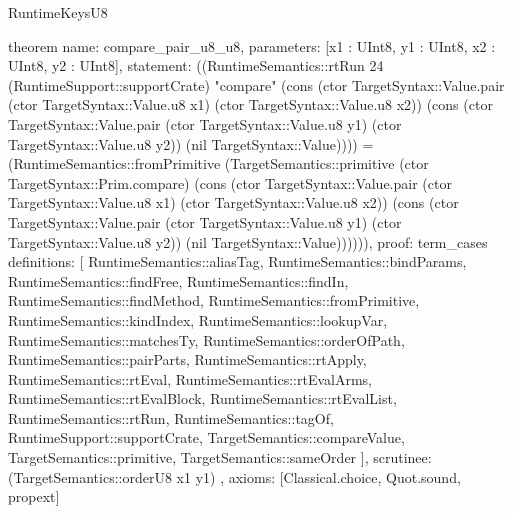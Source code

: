 \begin{lexlean}{RuntimeKeysU8}
\begin{semanticmodule}
theorem{
  name: compare_pair_u8_u8,
  parameters: [x1 : UInt8, y1 : UInt8, x2 : UInt8, y2 : UInt8],
  statement: ((RuntimeSemantics::rtRun 24 (RuntimeSupport::supportCrate) "compare" (cons (ctor TargetSyntax::Value.pair (ctor TargetSyntax::Value.u8 x1) (ctor TargetSyntax::Value.u8 x2)) (cons (ctor TargetSyntax::Value.pair (ctor TargetSyntax::Value.u8 y1) (ctor TargetSyntax::Value.u8 y2)) (nil TargetSyntax::Value)))) = (RuntimeSemantics::fromPrimitive (TargetSemantics::primitive (ctor TargetSyntax::Prim.compare) (cons (ctor TargetSyntax::Value.pair (ctor TargetSyntax::Value.u8 x1) (ctor TargetSyntax::Value.u8 x2)) (cons (ctor TargetSyntax::Value.pair (ctor TargetSyntax::Value.u8 y1) (ctor TargetSyntax::Value.u8 y2)) (nil TargetSyntax::Value)))))),
  proof: term_cases{
    definitions: [
      RuntimeSemantics::aliasTag,
      RuntimeSemantics::bindParams,
      RuntimeSemantics::findFree,
      RuntimeSemantics::findIn,
      RuntimeSemantics::findMethod,
      RuntimeSemantics::fromPrimitive,
      RuntimeSemantics::kindIndex,
      RuntimeSemantics::lookupVar,
      RuntimeSemantics::matchesTy,
      RuntimeSemantics::orderOfPath,
      RuntimeSemantics::pairParts,
      RuntimeSemantics::rtApply,
      RuntimeSemantics::rtEval,
      RuntimeSemantics::rtEvalArms,
      RuntimeSemantics::rtEvalBlock,
      RuntimeSemantics::rtEvalList,
      RuntimeSemantics::rtRun,
      RuntimeSemantics::tagOf,
      RuntimeSupport::supportCrate,
      TargetSemantics::compareValue,
      TargetSemantics::primitive,
      TargetSemantics::sameOrder
    ],
    scrutinee: (TargetSemantics::orderU8 x1 y1)
  },
  axioms: [Classical.choice, Quot.sound, propext]
}


\end{semanticmodule}
\end{lexlean}
